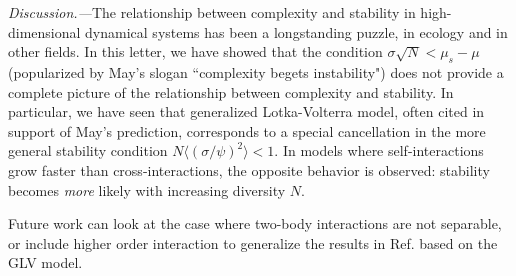 \emph{Discussion.---}The relationship between complexity and stability in high-dimensional dynamical systems has been a longstanding puzzle, in ecology and in other fields. 
In this letter, we have showed that the condition $\sigma\sqrt{N}< \mu_s - \mu$ (popularized by May's slogan ``complexity begets instability") does not provide a complete picture of the relationship between complexity and stability. 
In particular, we have seen that generalized Lotka-Volterra model, often cited in support of May's prediction, corresponds to a special cancellation in the more general stability condition $N\langle (\sigma/\psi)^2\rangle < 1$.
In models where self-interactions grow faster than cross-interactions, the opposite behavior is observed: stability becomes \emph{more} likely with increasing diversity $N$.

Future work can look at the case where two-body interactions are not separable, or include higher order interaction to generalize the results in Ref. \cite{Gibbs2022} based on the GLV model. 